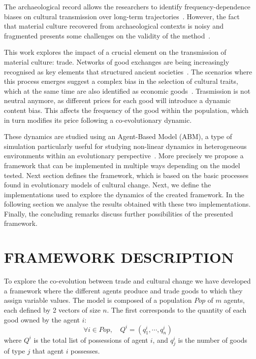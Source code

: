 \documentclass{wscpaperproc}
\begin{document}
The archaeological record allows the researchers to identify frequency-dependence biases on cultural transmission over long-term trajectories~\cite{lipo_neutralitystyle_2001,shennan_ceramic_2001,steele_ceramic_2010}. However, the fact that material culture recovered from archaeological contexts is noisy and fragmented presents some challenges on the validity of the method~\cite{kandler_nonequilibrium_2013,porcic_exploring_2014,crema_approximate_2014}.

This work explores the impact of a crucial element on the transmission of material culture: trade. Networks of good exchanges are being increasingly recognised as key elements that structured ancient societies~. The scenarios where this process emerges suggest a complex bias in the selection of cultural traits, which at the same time are also identified as economic goods~\cite{bentley_specialisation_2005,macmillan_agent-based_2008}. Trasmission is not neutral anymore, as different prices for each good will introduce a dynamic content bias. This affects the frequency of the good within the population, which in turn modifies its price following a co-evolutionary dynamic.

These dynamics are studied using an Agent-Based Model (ABM), a type of simulation particularly useful for studying non-linear dynamics in heterogeneous environments within an evolutionary perspective~\cite{lake_trends_2014}. More precisely we propose a framework that can be implemented in multiple ways depending on the model tested. Next section defines the framework, which is based on the basic processes found in evolutionary models of cultural change. Next, we define the implementations used to explore the dynamics of the created framework. In the following section we analyse the results obtained with these two implementations. Finally, the concluding remarks discuss further possibilities of the presented framework.

\section{FRAMEWORK DESCRIPTION}

To explore the co-evolution between trade and cultural change we have developed a framework where the different agents produce and trade goods to which they assign variable values. The model is composed of a population $Pop$ of $m$ agents, each defined by 2 vectors of size $n$. The first corresponds to the quantity of each good owned by the agent $i$: 
$$\forall i \in Pop, \quad Q^i = (q^i_1,\cdots,q^i_n) $$
where $Q^i$ is the total list of possessions of agent $i$, and $q^i_j$ is the number of goods of type $j$ that agent $i$ possesses.
\end{document}
